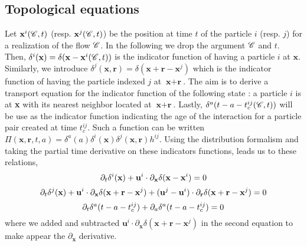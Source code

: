 \subsection{Topological equations}

Let $\textbf{x}^i(\mathscr{C},t)$ (resp. $\textbf{x}^j(\mathscr{C},t)$) be the position at time $t$ of the particle $i$ (resp. $j$) for a realization of the flow $\mathscr{C}$. 
In the following we drop the argument $\mathscr{C}$ and $t$. 
Then, $\delta^i(\textbf{x}) = \delta(\textbf{x}- \textbf{x}^i(\mathscr{C},t))$ is the indicator function of having a particle $i$ at  $\textbf{x}$.
Similarly, we introduce $\delta^j(\textbf{x},\textbf{r}) = \delta(\textbf{x} + \textbf{r} - \textbf{x}^j)$ which is the indicator function of having the particle indexed $j$ at $\textbf{x}+\textbf{r}$. 
The aim is to derive a transport equation for the indicator function of the following state : a particle $i$ is at \textbf{x} with its nearest neighbor located at $\textbf{x}+\textbf{r}$. 
Lastly, $\delta^a(t - a - t_c^{ij}(\mathscr{C},t))$ will be use as the indicator function indicating the age of the interaction for a particle pair created at time $t^{ij}_c$. 
Such a function can be written $\Pi(\textbf{x},\textbf{r},t,a) = \delta^a(a)\delta^i(\textbf{x}) \delta^j(\textbf{x},\textbf{r}) h^{ij}$. 
Using the distribution formalism and taking the partial time derivative on these indicators functions, leads us to these relations, 
\begin{equation*}
    \partial_t \delta^i(\textbf{x})
    + \textbf{u}^i  \cdot \partial_{\textbf{x}} \delta(\textbf{x} - \textbf{x}^i)
    = 0 
\end{equation*}
\begin{equation*}
    \partial_t \delta^j(\textbf{x})
    + \textbf{u}^i \cdot \partial_{\textbf{x}}  \delta(\textbf{x} + \textbf{r} - \textbf{x}^j)
    + (\textbf{u}^j - \textbf{u}^i) \cdot \partial_{\textbf{r}}  \delta(\textbf{x} + \textbf{r} - \textbf{x}^j)
    = 0 
\end{equation*}
\begin{equation*}
    \partial_t \delta^a(t - a - t_c^{ij})
    + 
    \partial_a \delta^a(t - a - t_c^{ij})
    = 0 
\end{equation*}
where we added and subtracted $\textbf{u}^i \cdot \partial_{\textbf{x}}  \delta(\textbf{x} + \textbf{r} - \textbf{x}^j)$ in the second equation to make appear the $\partial_{\textbf{x}}$ derivative. 
